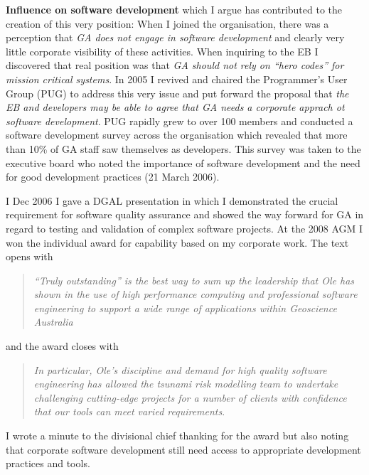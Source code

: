 \documentclass[10pt,a4paper]{article}
\begin{document}
\noindent \textbf{Influence on software development} which I argue has contributed to the creation of this very position:
   When I joined the organisation, there was a perception that \emph{GA does not engage in software development} and clearly very little corporate visibility of these activities. When inquiring to the EB I discovered that real position was that \emph{GA should not rely on ``hero codes'' for mission critical systems}. In 2005 I revived and chaired the Programmer's User Group (PUG) to address this very issue and put forward the proposal that \emph{the EB and developers may be able to agree that GA needs a corporate apprach ot software development}. PUG rapidly grew to over 100 members and conducted a software development survey across the organisation which revealed that more than 10\% of GA staff saw themselves as developers. This survey was taken to the executive board who noted the importance of software development and the need for good development practices (21 March 2006).

I Dec 2006 I gave a DGAL presentation in which I demonstrated the crucial requirement for software quality assurance and showed the way forward for GA in regard to testing and validation of complex software projects.
At the 2008 AGM I won the individual award for capability based on my corporate work. The text opens with
\begin{quote}
  \emph{“Truly outstanding” is the best way to sum up the leadership that Ole has shown in the use of high performance computing and professional software engineering to support a wide range of applications within Geoscience Australia}
\end{quote}
and the award closes with
\begin{quote}
  \emph{In particular, Ole’s discipline and demand for high quality software engineering has allowed the tsunami risk modelling team to undertake challenging cutting-edge projects for a number of clients with confidence that our tools can meet varied requirements}.
\end{quote}
 I wrote a minute to the divisional chief thanking for the award but also noting that corporate software development still need access to appropriate development practices and tools.\\
\end{document}
